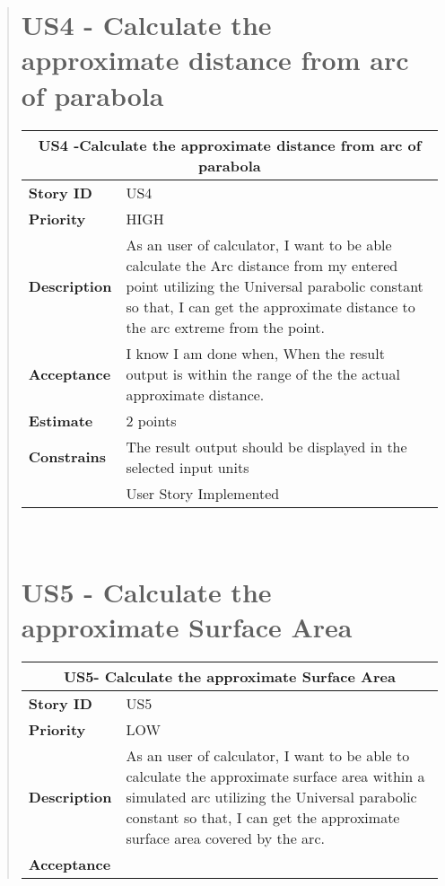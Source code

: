 \documentclass[12pt]{report}
\begin{document}
\begin{quote}
             \section{US4 - Calculate the approximate distance from arc of parabola}
                \begin{tabular}{ |p{4cm}|p{10cm}| }
                 \hline
                 \multicolumn{2}{|c|}{\textbf{US4 -Calculate the approximate distance from arc of parabola} } \\
                 \hline
                 \textbf {Story ID}& US4  \\
                 \hline
                 \textbf{Priority} & HIGH \\
                 \hline
                 \textbf{Description}   & As an user of calculator, I want to be able calculate the Arc distance from my entered point utilizing the Universal parabolic constant so that, I can get the approximate distance to the arc extreme from the point.  \\
                 \hline
                 \textbf{Acceptance}& 
                
                 I know I am done when,  When the result output is within the range of the the actual approximate distance. \\
                 \hline
                 \textbf{Estimate} &  2  points  \\
                 \hline
                 \textbf{Constrains}& The result output should be displayed in the selected input units  \\
                 \hline
                         \textbf {}&User Story Implemented \\
                \hline
                \end{tabular}
            \hfill\break\\
            
            
            
               \section{US5 - Calculate the approximate Surface Area}
                \begin{tabular}{ |p{4cm}|p{10cm}| }
                 \hline
                 \multicolumn{2}{|c|}{\textbf{US5- Calculate the approximate Surface Area} } \\
                 \hline
                 \textbf {Story ID}& US5  \\
                 \hline
                 \textbf{Priority} & LOW \\
                 \hline
                 \textbf{Description}   & As an user of calculator, I want to be able to calculate the approximate surface area within a simulated arc utilizing the Universal parabolic constant so that, I can get the approximate  surface area covered by the arc. \\
                 \hline
                 \textbf{Acceptance}& 
                

\end{tabular}
\end{quote}
\end{document}
